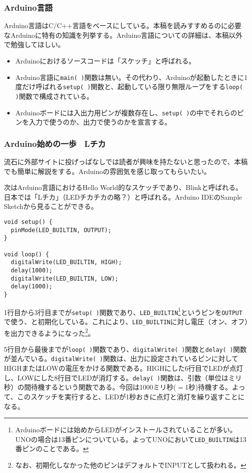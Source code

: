 \documentclass[uplatex, 10pt, dvipdfmx]{jsarticle}
\numberwithin{equation}{section}
\begin{document}
\subsubsection{Arduino言語}
Arduino言語はC/C++言語をベースにしている。本稿を読みすすめるのに必要なArduinoに特有の知識を列挙する。Arduino言語についての詳細は、本稿以外で勉強してほしい。
\begin{itemize}
\item Arduinoにおけるソースコードは「スケッチ」と呼ばれる。
\item Arduino言語に\texttt{main( )}関数は無い。その代わり、Arduinoが起動したときに1度だけ呼ばれる\texttt{setup( )}関数と、起動している限り無限ループをする\texttt{loop( )}関数で構成されている。
\item Arduinoボードには入出力用ピンが複数存在し、\texttt{setup( )}の中でそれらのピンを入力で使うのか、出力で使うのかを宣言する。
\end{itemize}

\subsubsection{Arduino始めの一歩　Lチカ}
流石に外部サイトに投げっぱなしでは読者が興味を持たないと思ったので、本稿でも簡単に解説をする。Arduinoの雰囲気を感じ取ってもらいたい。

次はArduino言語におけるHello World的なスケッチであり、Blinkと呼ばれる。日本では「Lチカ」（LEDチカチカの略？）と呼ばれる。Arduino IDEのSample Sketchから見ることができる。
\begin{lstlisting}[caption=Lチカ]
void setup() {
  pinMode(LED_BUILTIN, OUTPUT);
}

void loop() {
  digitalWrite(LED_BUILTIN, HIGH);
  delay(1000);
  digitalWrite(LED_BUILTIN, LOW);
  delay(1000);
}
\end{lstlisting}

1行目から3行目までが\verb|setup( )|関数であり、\verb|LED_BUILTIN|\footnote{Arduinoボードには始めからLEDがインストールされていることが多い。UNOの場合は13番ピンについている。よってUNOにおいて\verb|LED_BUILTIN|は13番ピンのことである。}というピンを\verb|OUTPUT|で使う、と初期化している。これにより、\verb|LED_BUILTIN|に対し電圧（オン、オフ）を出力できるようになった\footnote{なお、初期化しなかった他のピンはデフォルトでINPUTとして扱われる。}。

5行目から最後までが\verb|loop( )|関数であり、\verb|digitalWrite( )|関数と\verb|delay( )|関数が並んでいる。\verb|digitalWrite( )|関数は、出力に設定されているピンに対してHIGHまたはLOWの電圧をかける関数である。HIGHにした6行目でLEDが点灯し、LOWにした8行目でLEDが消灯する。\verb|delay( )|関数は、引数（単位はミリ秒）の間待機するという関数である。今回は1000ミリ秒($=$1秒)待機する。よって、このスケッチを実行すると、LEDが1秒おきに点灯と消灯を繰り返すことになる。
\end{document}
